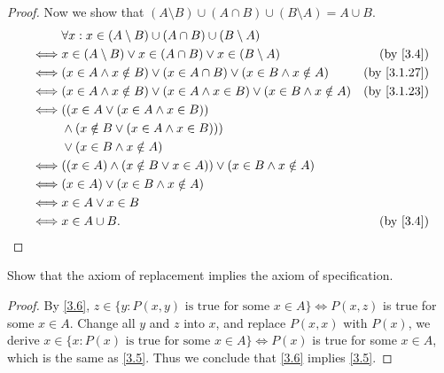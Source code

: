 \begin{proof}
  Now we show that \((A \setminus B) \cup (A \cap B) \cup (B \setminus A) = A \cup B\).
  \begin{align*}
         & \forall x : x \in (A \setminus B) \cup (A \cap B) \cup (B \setminus A)                                              \\
    \iff & x \in (A \setminus B) \lor x \in (A \cap B) \lor x \in (B \setminus A)                  & \text{(by \cref{3.4})}    \\
    \iff & (x \in A \land x \notin B) \lor (x \in A \cap B) \lor (x \in B \land x \notin A)        & \text{(by \cref{3.1.27})} \\
    \iff & (x \in A \land x \notin B) \lor (x \in A \land x \in B) \lor (x \in B \land x \notin A) & \text{(by \cref{3.1.23})} \\
    \iff & ((x \in A \lor (x \in A \land x \in B))                                                                             \\
         & \land (x \notin B \lor (x \in A \land x \in B)))                                                                    \\
         & \lor (x \in B \land x \notin A)                                                                                     \\
    \iff & ((x \in A) \land (x \notin B \lor x \in A)) \lor (x \in B \land x \notin A)                                         \\
    \iff & (x \in A) \lor (x \in B \land x \notin A)                                                                           \\
    \iff & x \in A \lor x \in B                                                                                                \\
    \iff & x \in A \cup B.                                                                         & \text{(by \cref{3.4})}
  \end{align*}
\end{proof}

\begin{ex}\label{ex:3.1.11}
  Show that the axiom of replacement implies the axiom of specification.
\end{ex}

\begin{proof}
  By \cref{3.6}, \(z \in \{y : P(x, y) \text{ is true for some } x \in A\} \iff P(x, z)\) is true for some \(x \in A\).
  Change all \(y\) and \(z\) into \(x\), and replace \(P(x, x)\) with \(P(x)\), we derive \(x \in \{x : P(x) \text{ is true for some } x \in A\} \iff P(x)\) is true for some \(x \in A\), which is the same as \cref{3.5}.
  Thus we conclude that \cref{3.6} implies \cref{3.5}.
\end{proof}